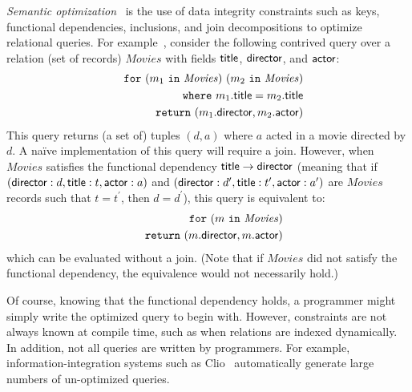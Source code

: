 \documentclass[preprint]{sigplanconf}
\newcommand{\FOR}{{\tt for}\relax\ifmmode\ \else\xspace\fi}
\newcommand{\WHERE}{{\tt where}\relax\ifmmode\ \else\xspace\fi}
\newcommand{\IN}{ \ {\tt in} \ }
\newcommand{\RETURN}{{\tt return}\relax\ifmmode\ \else\xspace\fi}
\newcommand{\greg}[1]{\textcolor{blue}{GREG: #1}}
\newcommand{\relation}[1]{\ensuremath{\mathit{#1}}\xspace}
\begin{document}
{\it Semantic optimization}~\cite{foundations,Deutsch:2006:QRC:1121995.1122010,Popa99anequational} is the 
use of data integrity constraints such as keys, functional dependencies, inclusions, and join decompositions to optimize relational queries. For example~\cite{foundations}, consider the following contrived query over a relation (set of records) \relation{Movies} 
with fields ${\sf title}$, ${\sf director}$, and ${\sf actor}$:
\begin{eqnarray*}
& & \FOR (m_1 \IN \relation{Movies}) \ (m_2 \IN \relation{Movies}) \\
 & & \WHERE m_1.{\sf title} = m_2.{\sf title} \\
 & & \RETURN (m_1.{\sf director}, m_2.{\sf actor})
\end{eqnarray*}        
This query returns (a set of) tuples $(d,a)$ where $a$ acted in a movie directed by $d$.  A na\"ive implementation of this query will require a join.  However, when \relation{Movies} satisfies the functional dependency ${\sf title} \to {\sf director}$ (meaning that 
if $({\sf director}: d, {\sf title}: t, {\sf actor}: a)$ and $({\sf director}: d^\prime, {\sf title}: t^\prime, {\sf actor}: a^\prime)$ are \relation{Movies} records such that $t = t^\prime$, then $d = d^\prime$), this query is equivalent to:
\begin{eqnarray*}
& & \FOR (m \IN \relation{Movies}) \\
 & & \RETURN (m.{\sf director}, m.{\sf actor})
 \end{eqnarray*}
which can be evaluated without a join.  (Note that if \relation{Movies} did not satisfy the functional dependency, the equivalence would not necessarily hold.)  

Of course, knowing that the functional dependency holds, a programmer might simply write the optimized query to begin with.
However, constraints are not always known at compile time, such as when relations are indexed dynamically.
In addition, not all queries are written by programmers.
For example, information-integration systems such as Clio~\cite{haas:clio} automatically generate large numbers of un-optimized queries. %
\end{document}
